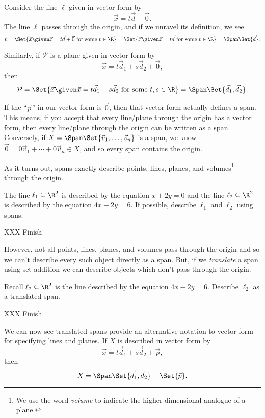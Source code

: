 Consider the line $\ell$ given in vector form by
\[
	\vec x=t\vec d+\vec 0.
\]
The line $\ell$ passes through the origin, and if we unravel its definition, we see
\[
	\ell=\Set{\vec x\given \vec x=t\vec d+\vec 0\text{ for some }t\in \R}
	=\Set{\vec x\given \vec x=t\vec d\text{ for some }t\in \R}=\Span\Set{\vec d}.
\]

Similarly, if $\mathcal P$ is a plane given in vector form by
\[
	\vec x=t\vec d_1+s\vec d_2+\vec 0,
\]
then
\[
	\mathcal P=
	\Set{\vec x\given \vec x=t\vec d_1+s\vec d_2\text{ for some }t,s\in \R}=\Span\Set{\vec d_1,\vec d_2}.
\]

If the ``$\vec p$'' in our vector form is $\vec 0$, then that vector form actually defines
a span. This means, if you accept that every line/plane through the origin has a
vector form, then every line/plane through the origin can be written as a span. Conversely,
if $X=\Span\Set{\vec v_1,\ldots,\vec v_n}$ is a span, we know $\vec 0=0\vec v_1+\cdots+0\vec v_n\in X$,
and so every span contains the origin.

As it turns out, spans exactly describe points, lines, planes, and volumes\footnote{
 We use the word \emph{volume} to indicate the higher-dimensional analogue of a plane.} through the origin.

\begin{example}
	The line $\ell_1\subseteq\R^2$ is described by the equation $x+2y=0$ and the line 
	$\ell_2\subseteq \R^2$ is described by the equation $4x-2y=6$.
	If possible, describe $\ell_1$ and $\ell_2$ using spans.

	XXX Finish
\end{example}

However, not all points, lines, planes, and volumes pass through the origin
and so we can't describe every such object directly as a span. But, if we \emph{translate} a span using set addition we
can describe objects which don't pass through the origin.

\begin{example}
	Recall $\ell_2\subseteq\R^2$ is the line described by the equation $4x-2y=6$.
	Describe $\ell_2$ as a translated span.

	XXX Finish
\end{example}

We can now see translated spans provide an alternative notation to vector form 
for specifying lines and planes. If $X$ is described in vector form by
\[
	\vec x=t\vec d_1+s\vec d_2+\vec p,
\]
then
\[
	X=\Span\Set{\vec d_1,\vec d_2}+\Set{\vec p}.
\]


